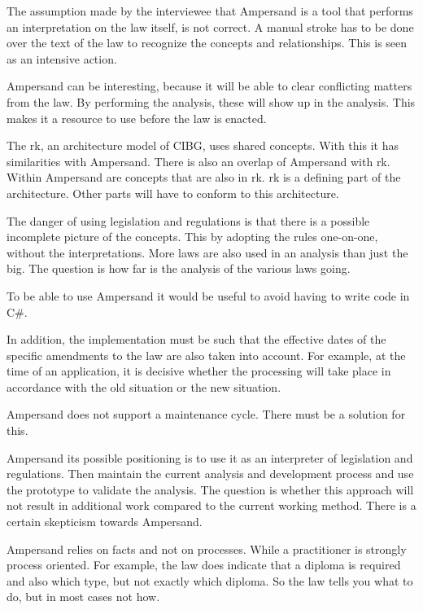 
{The assumption made by the interviewee that Ampersand is a tool that performs an interpretation on the law itself, is not correct. 
A manual stroke has to be done over the text of the law to recognize the concepts and relationships. 
This is seen as an intensive action.}

{Ampersand can be interesting, because it will be able to clear conflicting matters from the law. 
By performing the analysis, these will show up in the analysis. 
This makes it a resource to use before the law is enacted.}

{The \acrlong{rk}, an architecture model of CIBG, uses shared concepts. 
With this it has similarities with Ampersand. 
There is also an overlap of Ampersand with \acrlong{rk}. 
Within Ampersand are concepts that are also in \acrlong{rk}. 
\acrlong{rk} is a defining part of the architecture. Other parts will have to conform to this architecture.}

{The danger of using legislation and regulations is that there is a possible incomplete picture of the concepts. 
This by adopting the rules one-on-one, without the interpretations.
More laws are also used in an analysis than just the \acrshort{big}. 
The question is how far is the analysis of the various laws going.}

{To be able to use Ampersand it would be useful to avoid having to write code in C\#.}

{In addition, the implementation must be such that the effective dates of the specific amendments to the law are also taken into account. 
For example, at the time of an application, it is decisive whether the processing will take place in accordance with the old situation or the new situation.}

{Ampersand does not support a maintenance cycle. 
There must be a solution for this.}

{Ampersand its possible positioning is to use it as an interpreter of legislation and regulations. 
Then maintain the current analysis and development process and use the prototype to validate the analysis.
The question is whether this approach will not result in additional work compared to the current working method. 
There is a certain skepticism towards Ampersand.}

{Ampersand relies on facts and not on processes. 
While a practitioner is strongly process oriented. For example, the law does indicate that a diploma is required and also which type, but not exactly which diploma. 
So the law tells you what to do, but in most cases not how.}

